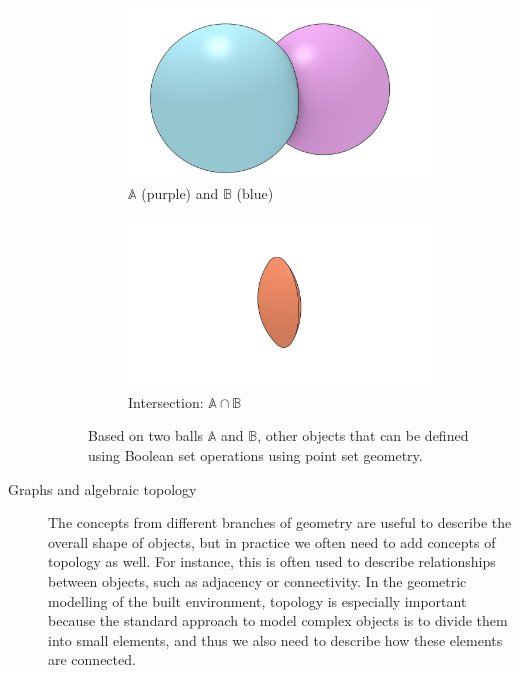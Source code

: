 \begin{description}
\begin{figure}[htbp]
\centering
\begin{subfigure}[b]{0.45\linewidth}
\includegraphics[width=\linewidth]{figs/boolean}
\caption{$\mathbb{A}$ (purple) and $\mathbb{B}$ (blue)}%
\label{subfig:boolean}
\end{subfigure}
\begin{subfigure}[b]{0.45\linewidth}
\includegraphics[width=\linewidth]{figs/boolean-intersection}
\caption{Intersection: $\mathbb{A} \cap \mathbb{B}$}%
\label{subfig:boolean-intersection}
\end{subfigure}
\caption{Based on two balls $\mathbb{A}$ and $\mathbb{B}$, other objects that can be defined using Boolean set operations using point set geometry.}%
\label{fig:boolean}
\end{figure}

\item[Graphs and algebraic topology]
The concepts from different branches of geometry are useful to describe the overall shape of objects, but in practice we often need to add concepts of topology as well.
For instance, this is often used to describe relationships between objects, such as adjacency or connectivity.
In the geometric modelling of the built environment, topology is especially important because the standard approach to model complex objects is to divide them into small elements, and thus we also need to describe how these elements are connected.


\end{description}
